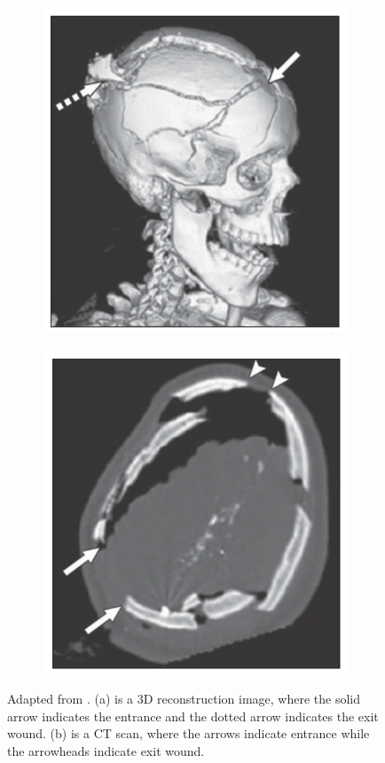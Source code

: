 \documentclass[titlepage]{article}
\begin{document}
\begin{figure}[h!]
\centering
\begin{subfigure}{.5\textwidth}
  \centering
  \includegraphics[width=.7\linewidth]{gunshot1}
  \caption{}
  \end{subfigure}%
\begin{subfigure}{.5\textwidth}
  \centering
  \includegraphics[width=.7\linewidth]{gunshot2}
  \caption{}
\end{subfigure}
\caption{Adapted from \cite{ballistic-trauma}. (a) is a 3D reconstruction image, where the solid arrow indicates the entrance and the dotted arrow indicates the exit wound. (b) is a CT scan, where the arrows indicate entrance while the arrowheads indicate exit wound.}
\label{fig:gunshot}
\end{figure}
\end{document}

